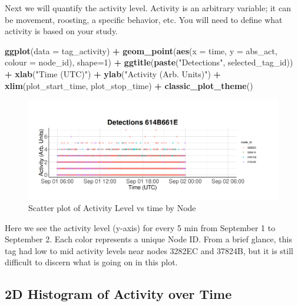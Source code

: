 \documentclass[
]{book}
\newenvironment{Shaded}{\begin{snugshade}}{\end{snugshade}}
\newcommand{\AttributeTok}[1]{\textcolor[rgb]{0.13,0.29,0.53}{#1}}
\newcommand{\DecValTok}[1]{\textcolor[rgb]{0.00,0.00,0.81}{#1}}
\newcommand{\FunctionTok}[1]{\textcolor[rgb]{0.13,0.29,0.53}{\textbf{#1}}}
\newcommand{\NormalTok}[1]{#1}
\newcommand{\SpecialCharTok}[1]{\textcolor[rgb]{0.81,0.36,0.00}{\textbf{#1}}}
\newcommand{\StringTok}[1]{\textcolor[rgb]{0.31,0.60,0.02}{#1}}
\begin{document}
Next we will quantify the activity level. Activity is an arbitrary variable; it can be movement, roosting, a specific behavior, etc. You will need to define what activity is based on your study.

\begin{Shaded}
\begin{Highlighting}[]
\FunctionTok{ggplot}\NormalTok{(}\AttributeTok{data =}\NormalTok{ tag\_activity) }\SpecialCharTok{+}
  \FunctionTok{geom\_point}\NormalTok{(}\FunctionTok{aes}\NormalTok{(}\AttributeTok{x =}\NormalTok{ time, }
                 \AttributeTok{y =}\NormalTok{ abs\_act, }
                 \AttributeTok{colour =}\NormalTok{ node\_id), }
             \AttributeTok{shape=}\DecValTok{1}\NormalTok{) }\SpecialCharTok{+}
  \FunctionTok{ggtitle}\NormalTok{(}\FunctionTok{paste}\NormalTok{(}\StringTok{"Detections"}\NormalTok{, selected\_tag\_id)) }\SpecialCharTok{+}
  \FunctionTok{xlab}\NormalTok{(}\StringTok{"Time (UTC)"}\NormalTok{) }\SpecialCharTok{+}
  \FunctionTok{ylab}\NormalTok{(}\StringTok{"Activity (Arb. Units)"}\NormalTok{) }\SpecialCharTok{+}
  \FunctionTok{xlim}\NormalTok{(plot\_start\_time, plot\_stop\_time) }\SpecialCharTok{+}
  \FunctionTok{classic\_plot\_theme}\NormalTok{()}
\end{Highlighting}
\end{Shaded}

\begin{figure}
\centering
\includegraphics{images/activity_level_activity_vs_time_by_node.png}
\caption{Scatter plot of Activity Level vs time by Node}
\end{figure}

Here we see the activity level (y-axis) for every 5 min from September 1 to September 2. Each color represents a unique Node ID. From a brief glance, this tag had low to mid activity levels near nodes 3282EC and 37824B, but it is still difficult to discern what is going on in this plot.

\subsection{2D Histogram of Activity over Time}\label{d-histogram-of-activity-over-time}
\end{document}
